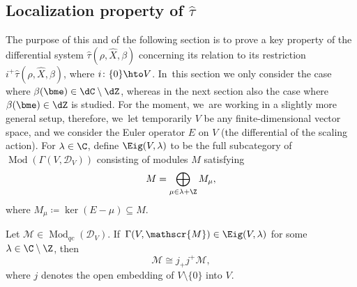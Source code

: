 \subsection{Localization property of \texorpdfstring{$\widehat{\tau}$}{\textbackslash hat\textbackslash tau}}
\label{subsec:LocProp}

The purpose of this and of the following section is to prove a key property of the differential system $\hat{\tau}(\rho, \hat{X},\beta)$ concerning its relation to its restriction $i^+\hat{\tau}(\rho, \hat{X},\beta)$, where $i \colon \{0\}\hto V$. In~this section we only consider the case where $\beta(\bme)\in\dC\setminus \dZ$, whereas in the next section also the case where $\beta(\bme)\in \dZ$ is studied. For the moment, we~are working in a slightly more general setup, therefore, we~let temporarily $V$ be any finite-dimensional vector space, and we consider the Euler operator $E$ on $V$ (\ie the differential of the scaling action). For $\lambda\in \C$, define $\Eig(V,\lambda)$ to be the full subcategory of $\operatorname{Mod}(\Gamma(V, \mathscr{D}_V))$ consisting of modules $M$ satisfying
\begin{equation}
M = \bigoplus_{\mu\in \lambda + \Z} M_\mu,
\end{equation}
where $M_\mu \coloneqq \ker(E-\mu)\subseteq M$.

\begin{prop}\label{prop:Eig-loc}
Let $\mathscr{M}\in \operatorname{Mod}_{qc} (\mathscr{D}_V)$. If~$\Gamma(V, \mathscr{M})\in \Eig(V,\lambda)$ for some $\lambda\in \C\setminus \Z$, then
\[
\mathscr{M}\cong j_+ j^+\mathscr{M},
\]
where $j$ denotes the open embedding of $V \setminus \{0\}$ into $V$.
\end{prop}

